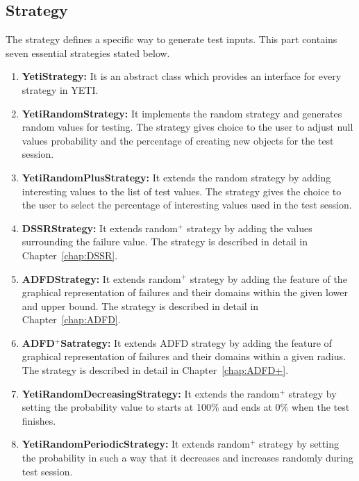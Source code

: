 \subsection{Strategy}
The strategy defines a specific way to generate test inputs. This part contains seven essential strategies stated below.
\begin{enumerate}
\item {\textbf{YetiStrategy:}} It is an abstract class which provides an interface for every strategy in YETI.
\item {\textbf{YetiRandomStrategy:}} It implements the random strategy and generates random values for testing. The strategy gives choice to the user to adjust null values probability and the percentage of creating new objects for the test session. 
\item {\textbf{YetiRandomPlusStrategy:}} It extends the random strategy by adding interesting values to the list of test values. The strategy gives the choice to the user to select the percentage of interesting values used in the test session.
\item {\textbf{DSSRStrategy:}} It extends random$^+$ strategy by adding the values surrounding the failure value. The strategy is described in detail in Chapter~\ref{chap:DSSR}.
\item {\textbf{ADFDStrategy:}} It extends random$^+$ strategy by adding the feature of the graphical representation of failures and their domains within the given lower and upper bound. The strategy is described in detail in Chapter~\ref{chap:ADFD}.
\item {\textbf{ADFD$^+$Satrategy:}} It extends ADFD strategy by adding the feature of graphical representation of failures and their domains within a given radius. The strategy is described in detail in Chapter~\ref{chap:ADFD+}.
\item {\textbf{YetiRandomDecreasingStrategy:}} It extends the random$^+$ strategy by setting the probability value to starts at 100\% and ends at 0\% when the test finishes.
\item {\textbf{YetiRandomPeriodicStrategy:}} It extends random$^+$ strategy by setting the probability in such a way that it decreases and increases randomly during test session.
\end{enumerate}

